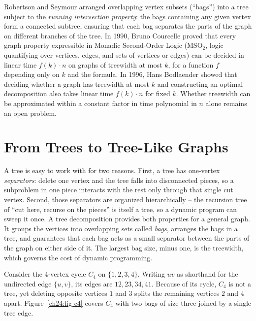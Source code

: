 \begin{historybox}
Robertson and Seymour arranged overlapping vertex subsets (``bags'') into a tree subject to the \emph{running
intersection property}: the bags containing any given vertex form a connected subtree, ensuring that
each bag separates the parts of the graph on different branches of the tree. In 1990, Bruno Courcelle
proved that every graph property expressible in Monadic Second-Order Logic ($\mathrm{MSO}_2$,
logic quantifying over vertices, edges, and sets of vertices or edges) can be decided in linear time
$f(k)\cdot n$ on graphs of treewidth at most $k$, for a function $f$ depending only on $k$ and the formula. In 1996, Hans Bodlaender showed that
deciding whether a graph has treewidth at most $k$ and constructing an optimal decomposition also takes
linear time $f(k)\cdot n$ for fixed $k$. Whether treewidth can be approximated within a
constant factor in time polynomial in $n$ alone remains an open problem.
\end{historybox}

\chapterline

\section{From Trees to Tree-Like Graphs}
\label{ch24:intro}

\begin{intuitionbox}
A tree is easy to work with for two reasons. First, a tree has one-vertex \emph{separators}:
delete one vertex and the tree falls into disconnected pieces, so a subproblem in
one piece interacts with the rest only through that single cut vertex. Second,
those separators are organized hierarchically -- the recursion tree of ``cut
here, recurse on the pieces'' is itself a tree, so a dynamic program can sweep it
once. A tree decomposition provides both properties for a general graph. It
groups the vertices into overlapping sets called \emph{bags}, arranges the bags
in a tree, and guarantees that each bag acts as a small separator between the
parts of the graph on either side of it. The largest bag size, minus one, is the
treewidth, which governs the cost of dynamic programming.
\end{intuitionbox}

Consider the $4$-vertex cycle $C_4$ on $\{1,2,3,4\}$. Writing $uv$ as shorthand for
the undirected edge $\{u,v\}$, its edges are $12, 23, 34, 41$. Because of its
cycle, $C_4$ is not a tree, yet deleting opposite vertices $1$ and $3$ splits the
remaining vertices $2$ and $4$ apart. Figure~\ref{ch24:fig-c4} covers $C_4$ with
two bags of size three joined by a single tree edge.

